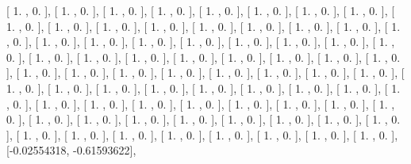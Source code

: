 \documentclass{article}
\begin{document}
       [ 1.        ,  0.        ],
       [ 1.        ,  0.        ],
       [ 1.        ,  0.        ],
       [ 1.        ,  0.        ],
       [ 1.        ,  0.        ],
       [ 1.        ,  0.        ],
       [ 1.        ,  0.        ],
       [ 1.        ,  0.        ],
       [ 1.        ,  0.        ],
       [ 1.        ,  0.        ],
       [ 1.        ,  0.        ],
       [ 1.        ,  0.        ],
       [ 1.        ,  0.        ],
       [ 1.        ,  0.        ],
       [ 1.        ,  0.        ],
       [ 1.        ,  0.        ],
       [ 1.        ,  0.        ],
       [ 1.        ,  0.        ],
       [ 1.        ,  0.        ],
       [ 1.        ,  0.        ],
       [ 1.        ,  0.        ],
       [ 1.        ,  0.        ],
       [ 1.        ,  0.        ],
       [ 1.        ,  0.        ],
       [ 1.        ,  0.        ],
       [ 1.        ,  0.        ],
       [ 1.        ,  0.        ],
       [ 1.        ,  0.        ],
       [ 1.        ,  0.        ],
       [ 1.        ,  0.        ],
       [ 1.        ,  0.        ],
       [ 1.        ,  0.        ],
       [ 1.        ,  0.        ],
       [ 1.        ,  0.        ],
       [ 1.        ,  0.        ],
       [ 1.        ,  0.        ],
       [ 1.        ,  0.        ],
       [ 1.        ,  0.        ],
       [ 1.        ,  0.        ],
       [ 1.        ,  0.        ],
       [ 1.        ,  0.        ],
       [ 1.        ,  0.        ],
       [ 1.        ,  0.        ],
       [ 1.        ,  0.        ],
       [ 1.        ,  0.        ],
       [ 1.        ,  0.        ],
       [ 1.        ,  0.        ],
       [ 1.        ,  0.        ],
       [ 1.        ,  0.        ],
       [ 1.        ,  0.        ],
       [ 1.        ,  0.        ],
       [ 1.        ,  0.        ],
       [ 1.        ,  0.        ],
       [ 1.        ,  0.        ],
       [ 1.        ,  0.        ],
       [ 1.        ,  0.        ],
       [ 1.        ,  0.        ],
       [ 1.        ,  0.        ],
       [ 1.        ,  0.        ],
       [ 1.        ,  0.        ],
       [ 1.        ,  0.        ],
       [ 1.        ,  0.        ],
       [ 1.        ,  0.        ],
       [ 1.        ,  0.        ],
       [ 1.        ,  0.        ],
       [ 1.        ,  0.        ],
       [ 1.        ,  0.        ],
       [ 1.        ,  0.        ],
       [ 1.        ,  0.        ],
       [ 1.        ,  0.        ],
       [ 1.        ,  0.        ],
       [ 1.        ,  0.        ],
       [ 1.        ,  0.        ],
       [ 1.        ,  0.        ],
       [-0.02554318, -0.61593622],
\end{document}

